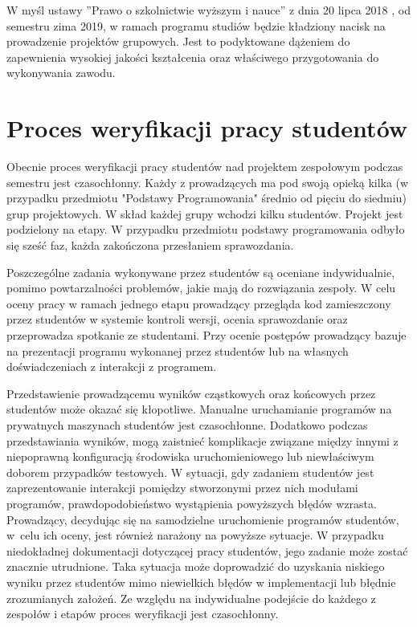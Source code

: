 W myśl ustawy ”Prawo o szkolnictwie wyższym i nauce” z dnia 20 lipca 2018 \cite{higher-education-law}, od semestru zima 2019, w ramach programu studiów będzie kładziony nacisk na prowadzenie projektów grupowych.
Jest to podyktowane dążeniem do zapewnienia wysokiej jakości kształcenia oraz właściwego przygotowania do wykonywania zawodu.

\vfill

\section{Proces weryfikacji pracy studentów}

Obecnie proces weryfikacji pracy studentów nad projektem zespołowym podczas semestru jest czasochłonny.
Każdy z prowadzących ma pod swoją opieką kilka (w przypadku przedmiotu "Podstawy Programowania" średnio od pięciu do siedmiu) grup projektowych.
W skład każdej grupy wchodzi kilku studentów.
Projekt jest podzielony na etapy. 
W przypadku przedmiotu podstawy programowania odbyło się sześć faz, każda zakończona przesłaniem sprawozdania.

Poszczególne zadania wykonywane przez studentów są oceniane indywidualnie, pomimo powtarzalności problemów, jakie mają do rozwiązania zespoły.
W celu oceny pracy w ramach jednego etapu prowadzący przegląda kod zamieszczony przez studentów w systemie kontroli wersji, ocenia sprawozdanie oraz przeprowadza spotkanie ze studentami.
Przy ocenie postępów prowadzący bazuje na prezentacji programu wykonanej przez studentów lub na własnych doświadczeniach z interakcji z programem.

Przedstawienie prowadzącemu wyników cząstkowych oraz końcowych przez studentów może okazać się kłopotliwe.
Manualne uruchamianie programów na prywatnych maszynach studentów jest czasochłonne.
Dodatkowo podczas przedstawiania wyników, mogą zaistnieć komplikacje związane między innymi z niepoprawną konfiguracją środowiska uruchomieniowego lub niewłaściwym doborem przypadków testowych.
W sytuacji, gdy zadaniem studentów jest zaprezentowanie interakcji pomiędzy stworzonymi przez nich modułami programów, prawdopodobieństwo wystąpienia powyższych błędów wzrasta.
Prowadzący, decydując się na samodzielne uruchomienie programów studentów, w~celu ich oceny, jest również narażony na powyższe sytuacje.
W przypadku niedokładnej dokumentacji dotyczącej pracy studentów, jego zadanie może zostać znacznie utrudnione.
Taka sytuacja może doprowadzić do uzyskania niskiego wyniku przez studentów mimo niewielkich błędów w implementacji lub błędnie zrozumianych założeń.
Ze względu na indywidualne podejście do każdego z zespołów i etapów proces weryfikacji jest czasochłonny.

